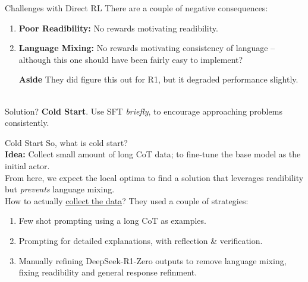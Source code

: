 \documentclass{beamer}
\begin{document}
\begin{frame}{Challenges with Direct RL}
	There are a couple of negative consequences:
	\begin{enumerate}[label=\arabic*.]
		\item \textbf{Poor Readibility:} No rewards motivating readibility. \pause
		\item \textbf{Language Mixing:} No rewards motivating consistency of language -- although this one should have been fairly easy to implement? \pause
			\begin{block}{\bf Aside}
				They did figure this out for R1, but it degraded performance slightly.
			\end{block} \pause
	\end{enumerate}
	~ \\
	Solution? \textbf{Cold Start}. Use SFT \textit{briefly}, to encourage approaching problems consistently.
\end{frame}

\begin{frame}{Cold Start}
	So, what is cold start? \\
	\textbf{Idea:} Collect small amount of long CoT data; to fine-tune the base model as the initial actor. \pause \newline \\

	From here, we expect the local optima to find a solution that leverages readibility but \textit{prevents} language mixing. \pause \newline \\

	How to actually \underline{collect the data}? \pause They used a couple of strategies:
	\begin{enumerate}[label=\arabic*.]
		\item Few shot prompting using a long CoT as examples. \pause \\
		\item Prompting for detailed explanations, with reflection \& verification. \pause \\
		\item Manually refining DeepSeek-R1-Zero outputs to remove language mixing, fixing readibility and general response refinment.
	\end{enumerate}
\end{frame}
\end{document}
